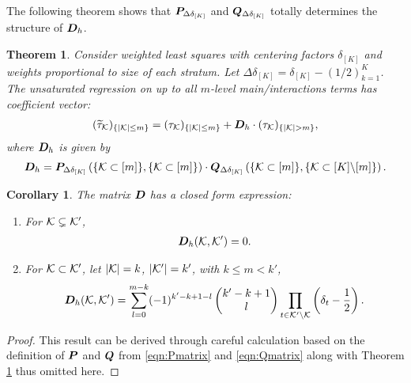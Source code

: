 \documentclass[12pt]{article}
\newtheorem{theorem}{Theorem}
\newtheorem{corollary}{Corollary}
\begin{document}
The following theorem shows that ${\boldsymbol{P}}_{\Delta\delta_{[K]}}$ and ${\boldsymbol{Q}}_{\Delta\delta_{[K]}}$ totally determines the structure of ${\boldsymbol{D}}_h$.


\begin{theorem}\label{thm:closeD}
Consider weighted least squares with centering factors $\delta_{[K]}$ and weights proportional to size of  each stratum. Let $\Delta\delta_{[K]} = \delta_{[K]}-(1/2)_{k=1}^K$. The unsaturated regression  on up to all $m$-level main/interactions terms has coefficient vector:
\begin{align}\label{eqn:wls-res}
    (\tilde{\tau}_{\cK})_{\{|\cK|\le m\}} = ({\tau}_{\cK})_{\{|\cK|\le m\}} + \bD_h\cdot({\tau}_{\cK})_{\{|\cK|> m\}},
\end{align}
where ${\boldsymbol{D}}_h$ is given by 
\begin{align*}
    {\boldsymbol{D}}_h = {\boldsymbol{P}}_{\Delta\delta_{[K]}}\left(\{{\mathcal{K}}\subset [m]\}, \{{\mathcal{K}}\subset [m]\}\right) \cdot {\boldsymbol{Q}}_{\Delta\delta_{[K]}}\left(\{{\mathcal{K}}\subset [m]\}, \{{\mathcal{K}}\subset [K] \backslash[m]\}\right).
\end{align*}
\end{theorem}




\begin{corollary}\label{cor:closeD}
The matrix ${\boldsymbol{D}}$ has a closed form expression:
\begin{enumerate}
    \item For ${\mathcal{K}}\subsetneq {\mathcal{K}}'$,
    \begin{align}
    {\boldsymbol{D}}_h({\mathcal{K}}, {\mathcal{K}}') = 0.
    \end{align}
     
    \item For ${\mathcal{K}}\subset {\mathcal{K}}'$, let $|{\mathcal{K}}|=k$, $|{\mathcal{K}}'|=k'$, with $k\le m <k'$,
    \begin{align}
    {\boldsymbol{D}}_h({\mathcal{K}}, {\mathcal{K}}') = \sum_{l=0}^{m-k} (-1)^{k'-k+1-l} \begin{pmatrix}
    k'-k+1 \\
    l
    \end{pmatrix}
    \prod_{t\in {\mathcal{K}}'\backslash {\mathcal{K}}}\left(\delta_t-\frac{1}{2}\right).
    \end{align}
\end{enumerate}

\end{corollary}

\begin{proof}
This result can be derived through careful calculation based on the definition of ${\boldsymbol{P}}$ and ${\boldsymbol{Q}}$ from \eqref{eqn:Pmatrix} and \eqref{eqn:Qmatrix} along with Theorem \ref{thm:closeD} thus omitted here. 
\end{proof}
\end{document}
